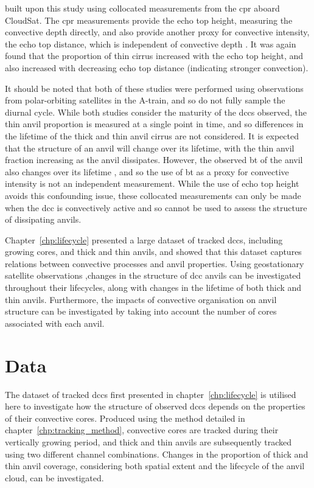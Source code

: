 \citet{takahashi_relationships_2017} built upon this study using collocated measurements from the \acrfull{cpr} aboard CloudSat.
The \acrshort{cpr} measurements provide the echo top height, measuring the convective depth directly, and also provide another proxy for convective intensity, the echo top distance, which is independent of convective depth \citep{takahashi_characterizing_2014}.
It was again found that the proportion of thin cirrus increased with the echo top height, and also increased with decreasing echo top distance (indicating stronger convection).

It should be noted that both of these studies were performed using observations from polar-orbiting satellites in the A-train, and so do not fully sample the diurnal cycle.
While both studies consider the maturity of the \acrshort{dcc}s observed, the thin anvil proportion is measured at a single point in time, and so differences in the lifetime of the thick and thin anvil cirrus are not considered.
It is expected that the structure of an anvil will change over its lifetime, with the thin anvil fraction increasing as the anvil dissipates.
However, the observed \acrshort{bt} of the anvil also changes over its lifetime \citep{futyan_deep_2007}, and so the use of \acrshort{bt} as a proxy for convective intensity is not an independent measurement.
While the use of echo top height avoids this confounding issue, these collocated measurements can only be made when the \acrfull{dcc} is convectively active and so cannot be used to assess the structure of dissipating anvils.

Chapter~\ref{chp:lifecycle} presented a large dataset of tracked \acrshort{dcc}s, including growing cores, and thick and thin anvils, and showed that this dataset captures relations between convective processes and anvil properties.
Using geostationary satellite observations ,changes in the structure of \acrshort{dcc} anvils can be investigated throughout their lifecycles, along with changes in the lifetime of both thick and thin anvils.
Furthermore, the impacts of convective organisation on anvil structure can be investigated by taking into account the number of cores associated with each anvil.


\section{Data}

The dataset of tracked \acrshort{dcc}s first presented in chapter~\ref{chp:lifecycle} is utilised here to investigate how the structure of observed \acrshort{dcc}s depends on the properties of their convective cores.
Produced using the method detailed in chapter~\ref{chp:tracking_method}, convective cores are tracked during their vertically growing period, and thick and thin anvils are subsequently tracked using two different channel combinations.
Changes in the proportion of thick and thin anvil coverage, considering both spatial extent and the lifecycle of the anvil cloud, can be investigated.

